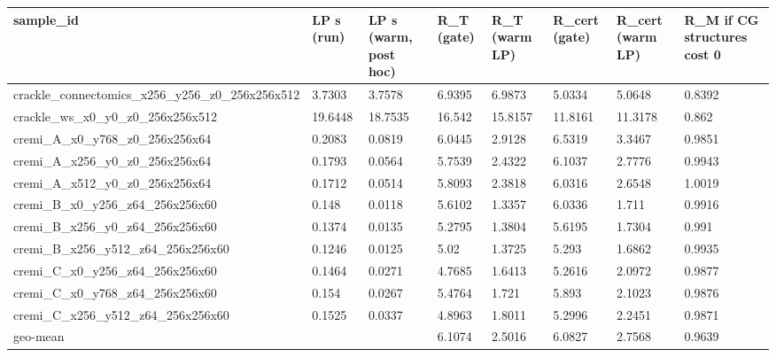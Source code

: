 \begin{tabular}{llllllll}
\hline
sample\_id & LP s (run) & LP s (warm, post hoc) & R\_T (gate) & R\_T (warm LP) & R\_cert (gate) & R\_cert (warm LP) & R\_M if CG structures cost 0 \\
\hline
crackle\_connectomics\_x256\_y256\_z0\_256x256x512 & 3.7303 & 3.7578 & 6.9395 & 6.9873 & 5.0334 & 5.0648 & 0.8392 \\
crackle\_ws\_x0\_y0\_z0\_256x256x512 & 19.6448 & 18.7535 & 16.542 & 15.8157 & 11.8161 & 11.3178 & 0.862 \\
cremi\_A\_x0\_y768\_z0\_256x256x64 & 0.2083 & 0.0819 & 6.0445 & 2.9128 & 6.5319 & 3.3467 & 0.9851 \\
cremi\_A\_x256\_y0\_z0\_256x256x64 & 0.1793 & 0.0564 & 5.7539 & 2.4322 & 6.1037 & 2.7776 & 0.9943 \\
cremi\_A\_x512\_y0\_z0\_256x256x64 & 0.1712 & 0.0514 & 5.8093 & 2.3818 & 6.0316 & 2.6548 & 1.0019 \\
cremi\_B\_x0\_y256\_z64\_256x256x60 & 0.148 & 0.0118 & 5.6102 & 1.3357 & 6.0336 & 1.711 & 0.9916 \\
cremi\_B\_x256\_y0\_z64\_256x256x60 & 0.1374 & 0.0135 & 5.2795 & 1.3804 & 5.6195 & 1.7304 & 0.991 \\
cremi\_B\_x256\_y512\_z64\_256x256x60 & 0.1246 & 0.0125 & 5.02 & 1.3725 & 5.293 & 1.6862 & 0.9935 \\
cremi\_C\_x0\_y256\_z64\_256x256x60 & 0.1464 & 0.0271 & 4.7685 & 1.6413 & 5.2616 & 2.0972 & 0.9877 \\
cremi\_C\_x0\_y768\_z64\_256x256x60 & 0.154 & 0.0267 & 5.4764 & 1.721 & 5.893 & 2.1023 & 0.9876 \\
cremi\_C\_x256\_y512\_z64\_256x256x60 & 0.1525 & 0.0337 & 4.8963 & 1.8011 & 5.2996 & 2.2451 & 0.9871 \\
geo-mean &  &  & 6.1074 & 2.5016 & 6.0827 & 2.7568 & 0.9639 \\
\hline
\end{tabular}
